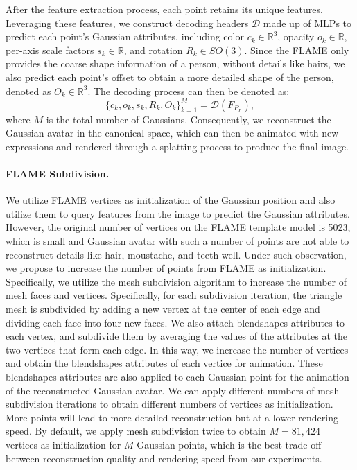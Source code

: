 After the feature extraction process, each point retains its unique features. Leveraging these features, we construct decoding headers $\mathcal{D}$ made up of MLPs to predict each point's Gaussian attributes, including color $c_k \in \mathbb{R}^3$, opacity $o_k \in \mathbb{R}$, per-axis scale factors $s_{k} \in \mathbb{R}$, and rotation $R_k \in SO(3)$. Since the FLAME only provides the coarse shape information of a person, without details like hairs, we also predict each point's offset to obtain a more detailed shape of the person, denoted as $O_k \in \mathbb{R}^3$. The decoding process can then be denoted as:
\begin{equation}
    \{c_k, o_k, s_k, R_k, O_k\}^{M}_{k=1} = \mathcal{D}(F_{P_{L}}),
\end{equation}
where $M$ is the total number of Gaussians. Consequently, we reconstruct the Gaussian avatar in the canonical space, which can then be animated with new expressions and rendered through a splatting process to produce the final image.


\paragraph{\textbf{FLAME Subdivision.}}
We utilize FLAME vertices as initialization of the Gaussian position and also utilize them to query features from the image to predict the Gaussian attributes. However, the original number of vertices on the FLAME template model is 5023, which is small and Gaussian avatar with such a number of points are not able to reconstruct details like hair, moustache, and teeth well. Under such observation, we propose to increase the number of points from FLAME as initialization. 
Specifically, we utilize the mesh subdivision algorithm to increase the number of mesh faces and vertices. Specifically, for each subdivision iteration, the triangle mesh is subdivided by adding a new vertex at the center of each edge and dividing each face into four new faces. We also attach blendshapes attributes to each vertex, and subdivide them by averaging the values of the attributes at the two vertices that form each edge. In this way, we increase the number of vertices and obtain the blendshapes attributes of each vertice for animation. These blendshapes attributes are also applied to each Gaussian point for the animation of the reconstructed Gaussian avatar. We can apply different numbers of mesh subdivision iterations to obtain different numbers of vertices as initialization. More points will lead to more detailed reconstruction but at a lower rendering speed. By default, we apply mesh subdivision twice to obtain $M=81,424$ vertices as initialization for $M$ Gaussian points, which is the best trade-off between reconstruction quality and rendering speed from our experiments.


